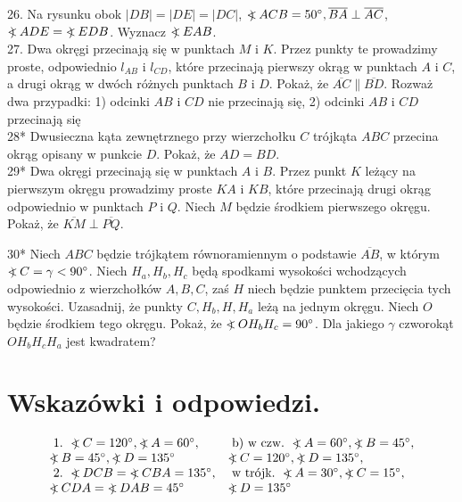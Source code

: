 \documentclass[10pt]{article}
\newcommand\Varangle{\mathop{{<\!\!\!\!\!\text{\small)}}\:}\nolimits}
\begin{document}
26. Na rysunku obok \(|D B|=|D E|=|D C|\), \(\Varangle A C B=50^{\circ}, \overline{B A} \perp \overline{A C}\), \(\Varangle A D E=\Varangle E D B\). Wyznacz \(\Varangle E A B\).\\
27. Dwa okręgi przecinają się w punktach \(M\) i \(K\). Przez punkty te prowadzimy proste, odpowiednio \(l_{A B}\) i \(l_{C D}\), które przecinają pierwszy okrąg w punktach \(A\) i \(C\), a drugi okrąg w dwóch różnych punktach \(B\) i \(D\). Pokaż, że \(\overline{A C} \| \overline{B D}\). Rozważ dwa przypadki: 1) odcinki \(A B\) i \(C D\) nie przecinają się, 2) odcinki \(A B\) i \(C D\) przecinają się\\
28* Dwusieczna kąta zewnętrznego przy wierzchołku \(C\) trójkąta \(A B C\) przecina okrąg opisany w punkcie \(D\). Pokaż, że \(A D=B D\).\\
29* Dwa okręgi przecinają się w punktach \(A\) i \(B\). Przez punkt \(K\) leżący na pierwszym okręgu prowadzimy proste \(K A\) i \(K B\), które przecinają drugi okrąg odpowiednio w punktach \(P\) i \(Q\). Niech \(M\) będzie środkiem pierwszego okręgu. Pokaż, że \(\overline{K M} \perp \overline{P Q}\).

30* Niech \(A B C\) będzie trójkątem równoramiennym o podstawie \(\overline{A B}\), w którym \(\Varangle C=\gamma<90^{\circ}\). Niech \(H_{a}, H_{b}, H_{c}\) będą spodkami wysokości wchodzących odpowiednio z wierzchołków \(A, B, C\), zaś \(H\) niech będzie punktem przecięcia tych wysokości. Uzasadnij, że punkty \(C, H_{b}, H, H_{a}\) leżą na jednym okręgu. Niech \(O\) będzie środkiem tego okręgu. Pokaż, że \(\Varangle O H_{b} H_{c}=90^{\circ}\). Dla jakiego \(\gamma\) czworokąt \(O H_{b} H_{c} H_{a}\) jest kwadratem?

\section*{Wskazówki i odpowiedzi.}
\[
\begin{array}{ll}
\text { 1. } \Varangle C=120^{\circ}, \Varangle A=60^{\circ}, & \text { b) w czw. } \Varangle A=60^{\circ}, \Varangle B=45^{\circ}, \\
\Varangle B=45^{\circ}, \Varangle D=135^{\circ} & \Varangle C=120^{\circ}, \Varangle D=135^{\circ}, \\
\text { 2. } \Varangle D C B=\Varangle C B A=135^{\circ}, & \text { w trójk. } \Varangle A=30^{\circ}, \Varangle C=15^{\circ}, \\
\Varangle C D A=\Varangle D A B=45^{\circ} & \Varangle D=135^{\circ}
\end{array}
\]
\end{document}

